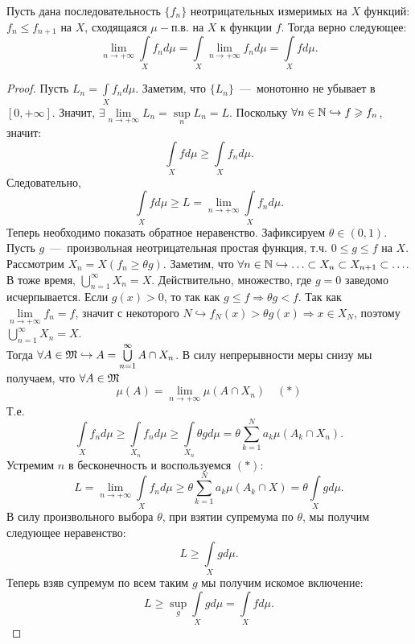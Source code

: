 \hypertarget{beppo_levi}{}
\begin{theorem}
    Пусть дана последовательность $\{f_n\}$ неотрицательных измеримых на $X$ функций: $f_n \leq f_{n + 1}$ на $X$, сходящаяся $\mu-$п.в. на $X$ к функции $f$. Тогда верно следующее: \[\lim\limits_{n \rightarrow +\infty} \int\limits_X f_nd\mu = \int\limits_X \lim\limits_{n \rightarrow +\infty} f_n d\mu = \int\limits_X fd\mu.\]
\end{theorem}
\begin{proof}
    Пусть $L_n = \int\limits_X f_nd\mu$. Заметим, что $\{L_n\}$~---~монотонно не убывает в $[0, +\infty]$. Значит, $\exists \lim\limits_{n\rightarrow+\infty} L_n = \sup\limits_n L_n = L$. Поскольку $\forall n \in \mathbb{N} \hookrightarrow f \geqslant f_n$, значит: \[\int\limits_X fd\mu \geq \int\limits_X f_nd\mu.\]
    Следовательно, \[\int\limits_X fd\mu \geq L = \lim\limits_{n \rightarrow +\infty} \int\limits_X f_nd\mu.\]
    Теперь необходимо показать обратное неравенство. Зафиксируем $\theta \in (0, 1)$. Пусть $g$~---~произвольная неотрицательная простая функция, т.ч. $0 \leq g \leq f$ на $X$.\\ Рассмотрим $X_n = X(f_n \geq \theta g)$. Заметим, что $ \forall n \in \mathbb{N} \hookrightarrow \ldots \subset X_n \subset X_{n + 1} \subset \ldots$. В тоже время, $\bigcup\limits_{n = 1}^\infty X_n = X$. Действительно, множество, где $g = 0$ заведомо исчерпывается. Если $g(x) > 0$, то так как $g \leq f \Rightarrow \theta g < f$. Так как $\lim\limits_{n\rightarrow +\infty}f_n = f$, значит с некоторого $N \hookrightarrow f_N(x) > \theta g(x) \Rightarrow x \in X_N$, поэтому $\bigcup\limits_{n = 1}^\infty X_n = X$. \\
    Тогда $\forall A \in \mathfrak{M} \hookrightarrow A = \bigcup\limits_{n = 1}^\infty A \cap X_n$. В силу непрерывности меры снизу мы получаем, что $\forall A \in \mathfrak{M}$ \begin{equation*}
        \mu(A) = \lim\limits_{n \rightarrow +\infty} \mu(A \cap X_n) \quad(*)
    \end{equation*}
    Т.е. \[\int\limits_X f_nd\mu \geq \int\limits_{X_n} f_nd\mu \geq \int\limits_{X_n} \theta g d\mu = \theta \sum\limits_{k = 1}^N a_k\mu(A_k \cap X_n).\]
    Устремим $n$ в бесконечность и воспользуемся $(*)$:
    \[L = \lim\limits_{n \rightarrow +\infty} \int\limits_X f_nd\mu \geq \theta\sum\limits_{k = 1}^N a_k\mu(A_k \cap X) = \theta\int\limits_{X} gd\mu.\]
    В силу произвольного выбора $\theta$, при взятии супремума по $\theta$, мы получим следующее неравенство: \[L \geq \int\limits_X gd\mu.\]
    Теперь взяв супремум по всем таким $g$ мы получим искомое включение: \[L \geq \sup\limits_g \int\limits_X gd\mu = \int\limits_X fd\mu.\]
\end{proof} 


